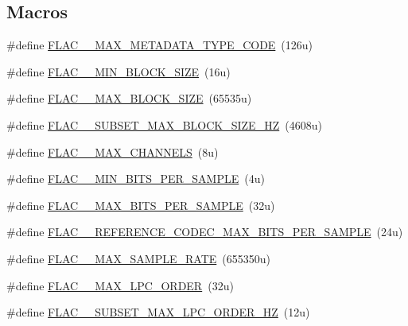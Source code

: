 \subsection*{Macros}
\begin{DoxyCompactItemize}
\item 
\#define \hyperlink{group__flac__format_ga626a412545818c2271fa2202c02ff1d6}{F\+L\+A\+C\+\_\+\+\_\+\+M\+A\+X\+\_\+\+M\+E\+T\+A\+D\+A\+T\+A\+\_\+\+T\+Y\+P\+E\+\_\+\+C\+O\+DE}~(126u)
\item 
\#define \hyperlink{group__flac__format_gaa5a85c2ea434221ce684be3469517003}{F\+L\+A\+C\+\_\+\+\_\+\+M\+I\+N\+\_\+\+B\+L\+O\+C\+K\+\_\+\+S\+I\+ZE}~(16u)
\item 
\#define \hyperlink{group__flac__format_gaef78bc1b04f721e7b4563381f5514e8d}{F\+L\+A\+C\+\_\+\+\_\+\+M\+A\+X\+\_\+\+B\+L\+O\+C\+K\+\_\+\+S\+I\+ZE}~(65535u)
\item 
\#define \hyperlink{group__flac__format_ga8f6ba2c28fbfcf52326d115c95b0a751}{F\+L\+A\+C\+\_\+\+\_\+\+S\+U\+B\+S\+E\+T\+\_\+\+M\+A\+X\+\_\+\+B\+L\+O\+C\+K\+\_\+\+S\+I\+Z\+E\+\_\+HZ}~(4608u)
\item 
\#define \hyperlink{group__flac__format_ga488aa5678a58d08f984f5d39185b763d}{F\+L\+A\+C\+\_\+\+\_\+\+M\+A\+X\+\_\+\+C\+H\+A\+N\+N\+E\+LS}~(8u)
\item 
\#define \hyperlink{group__flac__format_ga30b0f21abbb2cdfd461fe04b425b5438}{F\+L\+A\+C\+\_\+\+\_\+\+M\+I\+N\+\_\+\+B\+I\+T\+S\+\_\+\+P\+E\+R\+\_\+\+S\+A\+M\+P\+LE}~(4u)
\item 
\#define \hyperlink{group__flac__format_gad0156d56751e80241fa349d1e25064a6}{F\+L\+A\+C\+\_\+\+\_\+\+M\+A\+X\+\_\+\+B\+I\+T\+S\+\_\+\+P\+E\+R\+\_\+\+S\+A\+M\+P\+LE}~(32u)
\item 
\#define \hyperlink{group__flac__format_ga0fc418d96053d385fd2f56dce8007fbc}{F\+L\+A\+C\+\_\+\+\_\+\+R\+E\+F\+E\+R\+E\+N\+C\+E\+\_\+\+C\+O\+D\+E\+C\+\_\+\+M\+A\+X\+\_\+\+B\+I\+T\+S\+\_\+\+P\+E\+R\+\_\+\+S\+A\+M\+P\+LE}~(24u)
\item 
\#define \hyperlink{group__flac__format_ga99abeef0c05c6bc76eacfa865abbfa70}{F\+L\+A\+C\+\_\+\+\_\+\+M\+A\+X\+\_\+\+S\+A\+M\+P\+L\+E\+\_\+\+R\+A\+TE}~(655350u)
\item 
\#define \hyperlink{group__flac__format_ga16108d413f524329f338cff6e05f3aff}{F\+L\+A\+C\+\_\+\+\_\+\+M\+A\+X\+\_\+\+L\+P\+C\+\_\+\+O\+R\+D\+ER}~(32u)
\item 
\#define \hyperlink{group__flac__format_ga9791efa78147196820c86a6041d7774d}{F\+L\+A\+C\+\_\+\+\_\+\+S\+U\+B\+S\+E\+T\+\_\+\+M\+A\+X\+\_\+\+L\+P\+C\+\_\+\+O\+R\+D\+E\+R\+\_\+HZ}~(12u)

\end{DoxyCompactItemize}

